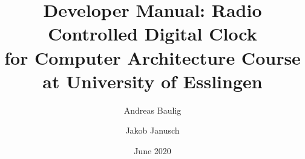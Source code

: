\documentclass[12pt,a4paper,hidelinks,oneside,english]{report}
\title{Developer Manual: Radio Controlled Digital Clock \\
\large for Computer Architecture Course at University of Esslingen}
\author{Andreas Baulig \and Jakob Janusch}
\date{June 2020}
\begin{document}
\maketitle{}

\tableofcontents

\listoffigures

\listoftables

\lstlistoflistings





\printbibliography
\end{document}
